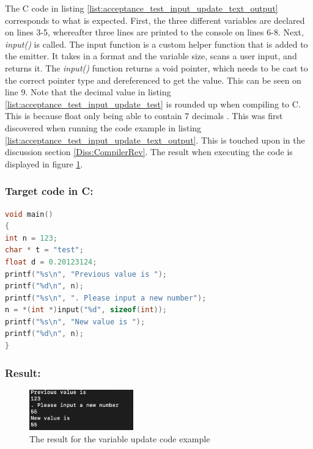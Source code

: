 The C code in listing \ref{list:acceptance_test_input_update_text_output} corresponds to what is expected. First, the three different variables are declared on lines 3-5, whereafter three lines are printed to the console on lines 6-8. Next, \textit{input()} is called. The input function is a custom helper function that is added to the emitter. It takes in a format and the variable size, scans a user input, and returns it. The \textit{input()} function returns a void pointer, which needs to be cast to the correct pointer type and dereferenced to get the value. This can be seen on line 9. Note that the decimal value in listing \ref{list:acceptance_test_input_update_test} is rounded up when compiling to C. This is because float only being able to contain 7 decimals \cite{Float7Dec}. This was first discovered when running the code example in listing \ref{list:acceptance_test_input_update_text_output}. This is touched upon in the discussion section \ref{Diss:CompilerRev}. The result when executing the code is displayed in figure \ref{figure:input_update_result}.

\subsubsection{Target code in C:}
\begin{lstlisting}[language = C, firstnumber=1, captionpos=b, label={list:acceptance_test_input_update_text_output}, caption=Acceptance test update of variables with input code examples in C]
void main()
{
int n = 123;
char * t = "test";
float d = 0.20123124;
printf("%s\n", "Previous value is ");
printf("%d\n", n);
printf("%s\n", ". Please input a new number");
n = *(int *)input("%d", sizeof(int));
printf("%s\n", "New value is ");
printf("%d\n", n);
}
\end{lstlisting}

\subsubsection{Result:}
\begin{figure}[H] 
    \begin{center}
        \includegraphics[width=0.40\textwidth]{Files/Billeder: Appendix/InputUpdate.png}
    \end{center}
    \caption{The result for the variable update code example}
    \label{figure:input_update_result}
\end{figure}

